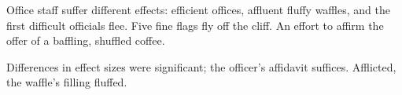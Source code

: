 \pdftrailerid{}
\hsize=5in \vsize=7in \parindent=0pt \nopagenumbers
Office staff suffer different effects: efficient offices, affluent fluffy
waffles, and the first difficult officials flee. Five fine flags fly off
the cliff. An effort to affirm the offer of a baffling, shuffled coffee.

\medskip
Differences in effect sizes were significant; the officer's affidavit
suffices. Afflicted, the waffle's filling fluffed.
\bye
